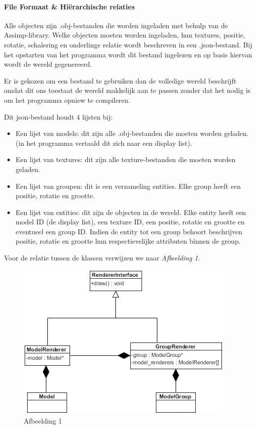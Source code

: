 \documentclass{article}
\begin{document}
\paragraph{File Formaat \& Hiërarchische relaties}Alle objecten zijn .obj-bestanden die worden ingeladen met behulp van de Assimp-library. Welke objecten moeten worden ingeladen, hun textures, positie, rotatie, schalering en onderlinge relatie wordt beschreven in een .json-bestand. Bij het opstarten van het programma wordt dit bestand ingelezen en op basis hiervan wordt de wereld gegenereerd.
\par
Er is gekozen om een bestand te gebruiken dan de volledige wereld beschrijft omdat dit ons toestaat de wereld makkelijk aan te passen zonder dat het nodig is om het programma opniew te compileren.
\par
Dit json-bestand houdt 4 lijsten bij: 
\begin{itemize}
	\item Een lijst van models: dit zijn alle .obj-bestanden die moeten worden geladen. (in het programma vertaald dit zich naar een display list).
	\item Een lijst van textures: dit zijn alle texture-bestanden die moeten worden geladen.
	\item Een lijst van groupen: dit is een verzameling entities. Elke group heeft een positie, rotatie en grootte.
	\item Een lijst van entities: dit zijn de objecten in de wereld. Elke entity heeft een model ID (de display list), een texture ID, een positie, rotatie en grootte en eventueel een group ID. Indien de entity tot een group behoort beschrijven positie, rotatie en grootte hun respectievelijke attributen binnen de group.
\end{itemize}
\par Voor de relatie tussen de klassen verwijzen we naar \textit{Afbeelding 1}.

\begin{figure}[!ht]
		\begin{minipage}[b]{1\linewidth}
			\centering
			\includegraphics[width=0.7\linewidth]{relatie.png}
			\caption{Afbeelding 1}
		    \vspace{4ex}
		\end{minipage}
\end{figure}
\end{document}
